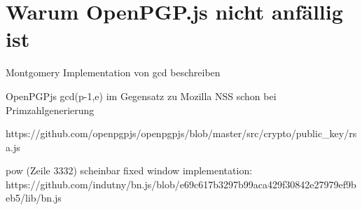 











\section{Warum OpenPGP.js nicht anfällig ist}

Montgomery Implementation von gcd beschreiben

OpenPGPjs gcd(p-1,e) im Gegensatz zu Mozilla NSS schon bei Primzahlgenerierung

https://github.com/openpgpjs/openpgpjs/blob/master/src/crypto/public_key/rsa.js

pow (Zeile 3332) scheinbar fixed window implementation:\\
https://github.com/indutny/bn.js/blob/e69c617b3297b99aca429f30842e27979ef9beb5/lib/bn.js

